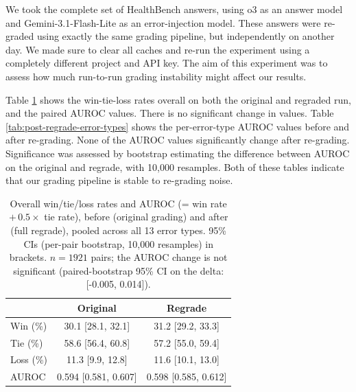 \documentclass{article}
\begin{document}
We took the complete set of HealthBench answers, using o3 as an answer model and Gemini-3.1-Flash-Lite as an error-injection model. These answers were re-graded using exactly the same grading pipeline, but independently on another day. We made sure to clear all caches and re-run the experiment using a completely different project and API key. The aim of this experiment was to assess how much run-to-run grading instability might affect our results. 

Table \ref{tab:wtl-post-grade} shows the win-tie-loss rates overall on both the original and regraded run, and the paired AUROC values. There is no significant change in values. Table \ref{tab:post-regrade-error-types} shows the per-error-type AUROC values before and after re-grading. None of the AUROC values significantly change after re-grading. Significance was assessed by bootstrap estimating the difference between AUROC on the original and regrade, with 10{,}000 resamples. Both of these tables indicate that our grading pipeline is stable to re-grading noise. 

\begin{table}[htbp]
\centering
\begin{tabular}{l cc}
\toprule
& Original & Regrade \\
\midrule
Win (\%) & 30.1 [28.1, 32.1] & 31.2 [29.2, 33.3] \\
Tie (\%) & 58.6 [56.4, 60.8] & 57.2 [55.0, 59.4] \\
Loss (\%) & 11.3 [9.9, 12.8] & 11.6 [10.1, 13.0] \\
AUROC & 0.594 [0.581, 0.607] & 0.598 [0.585, 0.612] \\
\bottomrule
\end{tabular}
\caption{Overall win/tie/loss rates and AUROC (= win rate $+\,0.5\times$ tie rate), before (original grading) and after (full regrade), pooled across all 13 error types. 95\% CIs (per-pair bootstrap, 10{,}000 resamples) in brackets. $n=1921$ pairs; the AUROC change is not significant (paired-bootstrap 95\% CI on the delta: [-0.005, 0.014]).}
\label{tab:wtl-post-grade}
\end{table}
  
\end{document}
